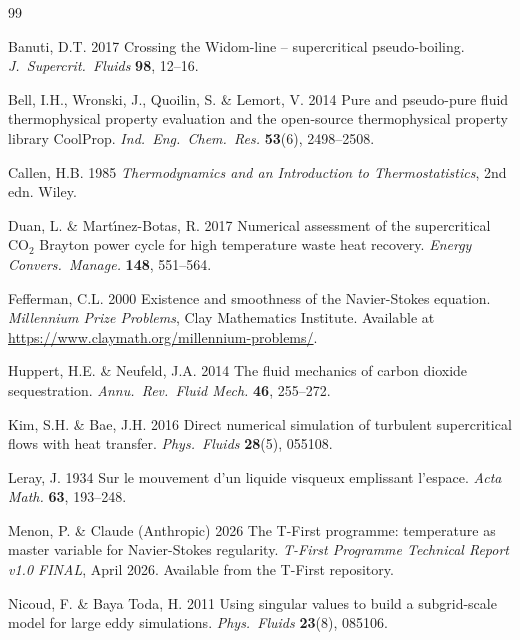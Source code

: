 \documentclass[12pt,a4paper]{article}
\begin{document}
\begin{thebibliography}{99}

Banuti, D.T. 2017
Crossing the Widom-line -- supercritical pseudo-boiling.
\textit{J.\ Supercrit.\ Fluids} \textbf{98}, 12--16.

Bell, I.H., Wronski, J., Quoilin, S. \& Lemort, V. 2014
Pure and pseudo-pure fluid thermophysical property evaluation and the
open-source thermophysical property library CoolProp.
\textit{Ind.\ Eng.\ Chem.\ Res.} \textbf{53}(6), 2498--2508.

Callen, H.B. 1985
\textit{Thermodynamics and an Introduction to Thermostatistics}, 2nd edn.
Wiley.

Duan, L. \& Mart\'{\i}nez-Botas, R. 2017
Numerical assessment of the supercritical CO$_2$ Brayton power cycle for
high temperature waste heat recovery.
\textit{Energy Convers.\ Manage.} \textbf{148}, 551--564.

Fefferman, C.L. 2000
Existence and smoothness of the Navier-Stokes equation.
\textit{Millennium Prize Problems}, Clay Mathematics Institute.
Available at \url{https://www.claymath.org/millennium-problems/}.

Huppert, H.E. \& Neufeld, J.A. 2014
The fluid mechanics of carbon dioxide sequestration.
\textit{Annu.\ Rev.\ Fluid Mech.} \textbf{46}, 255--272.

Kim, S.H. \& Bae, J.H. 2016
Direct numerical simulation of turbulent supercritical flows
with heat transfer.
\textit{Phys.\ Fluids} \textbf{28}(5), 055108.

Leray, J. 1934
Sur le mouvement d'un liquide visqueux emplissant l'espace.
\textit{Acta Math.} \textbf{63}, 193--248.

Menon, P. \& Claude (Anthropic) 2026
The T-First programme: temperature as master variable for Navier-Stokes regularity.
\textit{T-First Programme Technical Report v1.0 FINAL}, April 2026.
Available from the T-First repository.

Nicoud, F. \& Baya Toda, H. 2011
Using singular values to build a subgrid-scale model for large eddy simulations.
\textit{Phys.\ Fluids} \textbf{23}(8), 085106.


\end{thebibliography}
\end{document}
